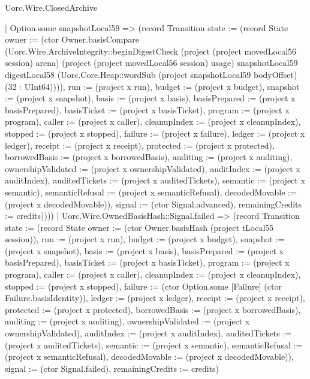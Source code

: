 \begin{lexlean}{Uorc.Wire.ClosedArchive}
\begin{semanticmodule}
{        | Option.some snapshotLocal59 => (record Transition {state := (record State {owner := (ctor Owner.basisCompare (Uorc.Wire.ArchiveIntegrity::beginDigestCheck (project (project movedLocal56 session) arena) (project (project movedLocal56 session) usage) snapshotLocal59 digestLocal58 (Uorc.Core.Heap::wordSub (project snapshotLocal59 bodyOffset) (32 : UInt64)))), run := (project x run), budget := (project x budget), snapshot := (project x snapshot), basis := (project x basis), basisPrepared := (project x basisPrepared), basisTicket := (project x basisTicket), program := (project x program), caller := (project x caller), cleanupIndex := (project x cleanupIndex), stopped := (project x stopped), failure := (project x failure), ledger := (project x ledger), receipt := (project x receipt), protected := (project x protected), borrowedBasis := (project x borrowedBasis), auditing := (project x auditing), ownershipValidated := (project x ownershipValidated), auditIndex := (project x auditIndex), auditedTickets := (project x auditedTickets), semantic := (project x semantic), semanticRefusal := (project x semanticRefusal), decodedMovable := (project x decodedMovable)}), signal := (ctor Signal.advanced), remainingCredits := credits}))))
    | Uorc.Wire.OwnedBasisHash::Signal.failed => (record Transition {state := (record State {owner := (ctor Owner.basisHash (project tLocal55 session)), run := (project x run), budget := (project x budget), snapshot := (project x snapshot), basis := (project x basis), basisPrepared := (project x basisPrepared), basisTicket := (project x basisTicket), program := (project x program), caller := (project x caller), cleanupIndex := (project x cleanupIndex), stopped := (project x stopped), failure := (ctor Option.some [Failure] (ctor Failure.basisIdentity)), ledger := (project x ledger), receipt := (project x receipt), protected := (project x protected), borrowedBasis := (project x borrowedBasis), auditing := (project x auditing), ownershipValidated := (project x ownershipValidated), auditIndex := (project x auditIndex), auditedTickets := (project x auditedTickets), semantic := (project x semantic), semanticRefusal := (project x semanticRefusal), decodedMovable := (project x decodedMovable)}), signal := (ctor Signal.failed), remainingCredits := credits})
}
\end{semanticmodule}
\end{lexlean}
